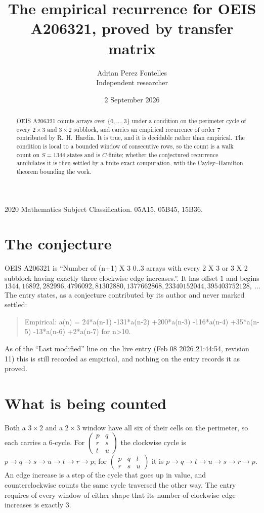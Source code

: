 \documentclass[11pt,a4paper]{article}
\title{The empirical recurrence for OEIS A206321, proved by transfer matrix}
\author{Adrian Perez Fontelles\\ \small Independent researcher}
\date{2 September 2026}
\theoremstyle{plain}
\theoremstyle{definition}
\begin{document}
\maketitle

\begin{abstract}
OEIS A206321 counts arrays over $\{0,\dots,3\}$ under a condition on the perimeter cycle of
every $2\times3$ and $3\times2$ subblock, and carries an empirical recurrence of order $7$ contributed by
R.~H.~Hardin. It is true, and it is decidable rather than empirical. The condition is local to
a bounded window of consecutive rows, so the count is a walk count on $S=1344$ states and is
$C$-finite; whether the conjectured recurrence annihilates it is then settled by a finite exact
computation, with the Cayley--Hamilton theorem bounding the work.
\end{abstract}

\noindent\small 2020 Mathematics Subject Classification. 05A15, 05B45, 15B36.\normalsize

\section{The conjecture}

OEIS A206321 is ``Number of (n+1) X 3 0..3 arrays with every 2 X 3 or 3 X 2 subblock having exactly three clockwise edge increases.''. It has offset $1$ and begins
\[
1344, 16892, 282996, 4796092, 81302880, 1377662868, 23340152044, 395403752128,\ \dots
\]
The entry states, as a conjecture contributed by its author and never marked settled:
\begin{quote}
Empirical: a(n) = 24*a(n-1) -131*a(n-2) +200*a(n-3) -116*a(n-4) +35*a(n-5) -13*a(n-6) +2*a(n-7) for n>10.
\end{quote}
As of the ``Last modified'' line on the live entry (Feb 08 2026 21:44:54, revision 11) this is still
recorded as empirical, and nothing on the entry records it as proved.

\section{What is being counted}

Both a $3\times2$ and a $2\times3$ window have all six of their cells on the
perimeter, so each carries a $6$-cycle. For
$\begin{pmatrix}p&q\\r&s\\t&u\end{pmatrix}$ the clockwise cycle is
$p\to q\to s\to u\to t\to r\to p$; for
$\begin{pmatrix}p&q&t\\r&s&u\end{pmatrix}$ it is
$p\to q\to t\to u\to s\to r\to p$. An edge increase is a step of the cycle that goes up in
value, and counterclockwise counts the same cycle traversed the other way. The entry requires
of every window of either shape that its number of clockwise edge increases is exactly $3$.
\end{document}
